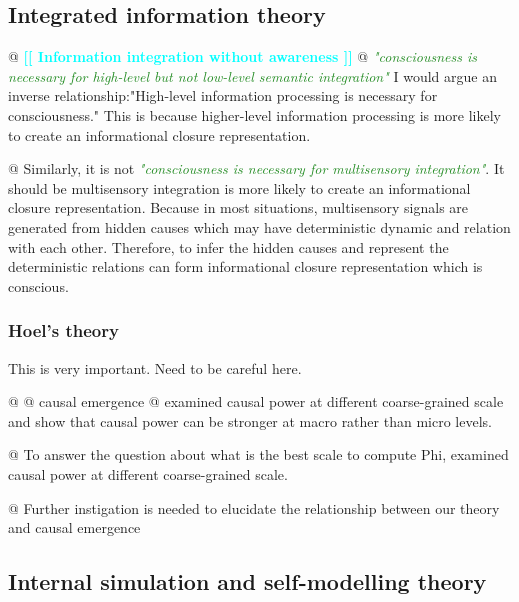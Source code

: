 \documentclass[utf8]{article}
\newenvironment{ants}
			{
			 \begin{easylist}[itemize]		
		 	}
			{
			\end{easylist}
			}
\newcommand{\rewrite}[1]{\textcolor{ForestGreen}{\textit{"#1"}}\newline}
\newcommand{\ideaBox}[1]{
				\begin{tcolorbox}[hyphenationfix, width=12cm, colback=Thistle!50!white, flush right]
					#1
				\end{tcolorbox}
			}
\newcommand{\toWrite}[1]{\noindent
			\textcolor{Cyan}{\textbf{[[ #1 ]]}}}
\newcommand{\callforhelp}[1]{\todo[color=SpringGreen]{#1}}
\begin{document}
			
		\subsection{Integrated information theory\callforhelp{Help from Jun?}}
			\begin{ants}
				@ \toWrite{Information integration without awareness}\cite{Mudrik_Faivre_Koch}
				@ \rewrite{consciousness is necessary for high-level but not low-level semantic integration}\cite{Mudrik_Faivre_Koch} I would argue an inverse relationship:"High-level information processing is necessary for consciousness." This is because higher-level information processing is more likely to create an informational closure representation. 
				
				@ Similarly, it is not \rewrite{consciousness is necessary for multisensory integration}. It should be multisensory integration is more likely to create an informational closure representation. Because in most situations, multisensory signals are generated from hidden causes which may have deterministic dynamic and relation with each other. Therefore, to infer the hidden causes and represent the deterministic relations can form informational closure representation which is conscious.  
				
			\end{ants}
						
			
			\subsubsection{Hoel's theory\callforhelp{Help from Martin?}}
				\ideaBox{This is very important. Need to be careful here.}
				
				
				\begin{ants}
					@ \cite{hoel2016can}
					@ causal emergence
					@ \cite{hoel2013quantifying} examined causal power at different coarse-grained scale and show that causal power can be stronger at macro rather than micro levels. 
					
					
					@ To answer the question about what is the best scale to compute Phi, \cite{hoel2016can} examined causal power at different coarse-grained scale. 
					
					@ Further instigation is needed to elucidate the relationship between our theory and causal emergence
					
					
				\end{ants}
				
				
		\subsection{Internal simulation and self-modelling theory}
		
\end{document}
